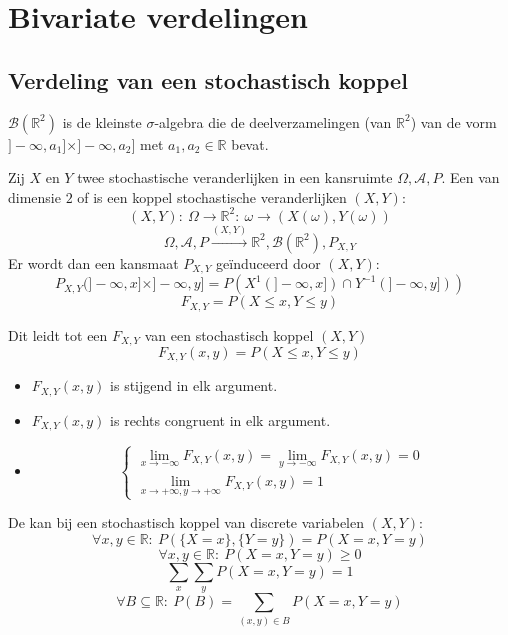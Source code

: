 \documentclass[main.tex]{subfiles}
\begin{document}
\chapter{Bivariate verdelingen}
\label{cha:bivar-verd}

\section{Verdeling van een stochastisch koppel}
\label{sec:verdeling-van-een}

\begin{de}
  $\mathcal{B}(\mathbb{R}^{2})$ is de kleinste $\sigma$-algebra die de deelverzamelingen (van $\mathbb{R}^{2}$) van de vorm $]-\infty,a_{1}]\times]-\infty,a_{2}]$ met $a_{1},a_{2}\in\mathbb{R}$ bevat.
\end{de}

\begin{de}
  Zij $X$ en $Y$ twee stochastische veranderlijken in een kansruimte $\Omega,\mathcal{A},P$.
  Een  van dimensie $2$ of  is een koppel stochastische veranderlijken $(X,Y)$:
  \[ (X,Y):\ \Omega \rightarrow \mathbb{R}^{2}:\ \omega \rightarrow (X(\omega),Y(\omega)) \]
  \[ \Omega,\mathcal{A},P \overset{(X,Y)}{\rightarrow} \mathbb{R}^{2},\mathcal{B}(\mathbb{R}^{2}), P_{X,Y} \]
  Er wordt dan een kansmaat $P_{X,Y}$ ge\"induceerd door $(X,Y)$:
  \[ P_{X,Y}(]-\infty,x]\times]-\infty,y] = P(X^{1}(]-\infty,x])\cap Y^{-1}(]-\infty,y])) \]
  \[ F_{X,Y} = P(X \le x, Y\le y) \]
\end{de}
\begin{de}
  Dit leidt tot een  $F_{X,Y}$ van een stochastisch koppel $(X,Y)$
  \[ F_{X,Y}(x,y) = P(X\le x, Y\le y) \]
  \begin{itemize}
  \item $F_{X,Y}(x,y)$ is stijgend in elk argument.
  \item $F_{X,Y}(x,y)$ is rechts congruent in elk argument.
  \item 
    \[ 
    \begin{cases}
      \lim_{x\rightarrow -\infty} F_{X,Y}(x,y) = \lim_{y\rightarrow -\infty} F_{X,Y}(x,y) = 0\\
      \lim_{x\rightarrow +\infty,y\rightarrow +\infty} F_{X,Y}(x,y) = 1
    \end{cases}
    \]
  \end{itemize}
\end{de}

\begin{de}
  De kan bij een stochastisch koppel van discrete variabelen $(X,Y)$:
  \[ \forall x,y \in \mathbb{R}:\ P(\{X=x\},\{Y=y\}) = P(X=x,Y=y) \]
  \[ \forall x,y \in \mathbb{R}:\ P(X=x,Y=y) \ge 0 \]
  \[ \sum_{x}\sum_{y}P(X=x,Y=y) = 1 \]
  \[ \forall B \subseteq \mathbb{R}:\ P(B) = \sum_{(x,y)\in B}P(X=x,Y=y) \]
\end{de}
\end{document}
